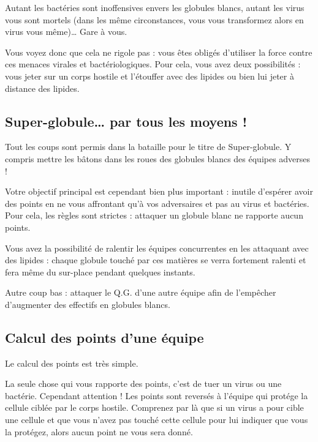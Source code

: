 \documentclass[a4paper,twoside,12pt]{article}
\begin{document}
Autant les  bact\'eries sont inoffensives envers  les globules blancs,
autant  les virus vous  sont mortels  (dans les  m\^eme circonstances,
vous  vous transformez alors  en virus  vous m\^eme)\ldots{}  Gare \`a
vous.

Vous  voyez  donc que  cela  ne rigole  pas  :  vous \^etes  oblig\'es
d'utiliser    la    force    contre    ces    menaces    virales    et
bact\'eriologiques. Pour  cela, vous  avez deux possibilit\'es  : vous
jeter sur  un corps hostile et  l'\'etouffer avec des  lipides ou bien
lui jeter \`a distance des lipides.

\subsection{Super-globule\ldots{} par tous les moyens !}

Tout  les  coups  sont  permis  dans  la bataille  pour  le  titre  de
Super-globule.  Y  compris mettre  les  b\^atons  dans  les roues  des
globules blancs des \'equipes adverses !

Votre objectif  principal est cependant bien plus  important : inutile
d'esp\'erer  avoir  des  points  en  ne  vous  affrontant  qu'\`a  vos
adversaires et  pas au virus  et bact\'eries. Pour cela,  les r\`egles
sont strictes : attaquer un globule blanc ne rapporte aucun points.

Vous avez  la possibilit\'e de ralentir les  \'equipes concurrentes en
les  attaquant avec  des lipides  :  chaque globule  touch\'e par  ces
mati\`eres  se verra  fortement ralenti  et fera  m\^eme  du sur-place
pendant quelques instants.

Autre  coup bas  :  attaquer le  Q.G.   d'une autre  \'equipe afin  de
l'emp\^echer d'augmenter des effectifs en globules blancs.

\subsection{Calcul des points d'une \'equipe}

Le calcul des points est tr\`es simple.

La seule chose qui vous rapporte des points, c'est de tuer un virus ou
une bact\'erie.  Cependant attention ! Les points  sont revers\'es \`a
l'\'equipe   qui  prot\'ege   la   cellule  cibl\'ee   par  le   corps
hostile. Comprenez par  l\`a que si un virus a  pour cible une cellule
et que  vous n'avez pas touch\'e  cette cellule pour  lui indiquer que
vous la prot\'egez, alors aucun point ne vous sera donn\'e.
\end{document}
